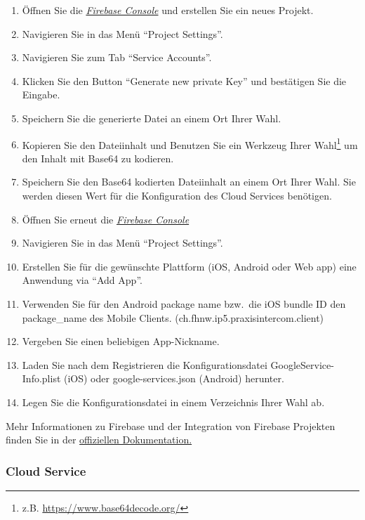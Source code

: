 \begin{enumerate}
    \item Öffnen Sie die \href{https://console.firebase.google.com/}{\textit{Firebase Console}} und erstellen Sie ein neues Projekt.
    \item Navigieren Sie in das Menü ``Project Settings''.
    \item Navigieren Sie zum Tab ``Service Accounts''.
    \item Klicken Sie den Button ``Generate new private Key'' und bestätigen Sie die Eingabe.
    \item Speichern Sie die generierte Datei an einem Ort Ihrer Wahl.
    \item Kopieren Sie den Dateiinhalt und Benutzen Sie ein Werkzeug Ihrer Wahl\footnote{z.B. \url{https://www.base64decode.org/}} um den Inhalt mit Base64 zu kodieren.
    \item Speichern Sie den Base64 kodierten Dateiinhalt an einem Ort Ihrer Wahl. Sie werden diesen Wert für die Konfiguration des Cloud Services benötigen.
    \item Öffnen Sie erneut die \href{https://console.firebase.google.com/}{\textit{Firebase Console}}
    \item Navigieren Sie in das Menü ``Project Settings''.
    \item Erstellen Sie für die gewünschte Plattform (iOS, Android oder Web app) eine Anwendung via ``Add App''.
    \item Verwenden Sie für den Android package name bzw.\ die iOS bundle ID den package\_name des Mobile Clients. (ch.fhnw.ip5.praxisintercom.client)
    \item Vergeben Sie einen beliebigen App-Nickname.
    \item Laden Sie nach dem Registrieren die Konfigurationsdatei GoogleService-Info.plist (iOS) oder google-services.json (Android) herunter.
    \item Legen Sie die Konfigurationsdatei in einem Verzeichnis Ihrer Wahl ab.
\end{enumerate}

Mehr Informationen zu Firebase und der Integration von Firebase Projekten finden Sie in der \href{https://firebase.google.com/docs/projects/learn-more#setting_up_a_firebase_project_and_registering_apps}{offiziellen Dokumentation.}\cite{understand-firebase}

\subsubsection*{Cloud Service}

